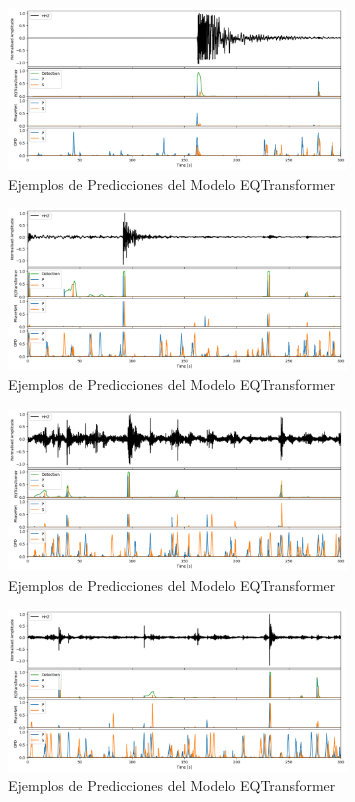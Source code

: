 \begin{figure}
\centering
\includegraphics[width=0.8\textwidth]{figures/testing/image0.png}
\caption{Ejemplos de Predicciones del Modelo EQTransformer}
\label{fig:predicciones}
\end{figure}

\begin{figure}
\centering
\includegraphics[width=0.8\textwidth]{figures/testing/image1.png}
\caption{Ejemplos de Predicciones del Modelo EQTransformer}
\label{fig:predicciones}
\end{figure}

\begin{figure}
\centering
\includegraphics[width=0.8\textwidth]{figures/testing/image3.png}
\caption{Ejemplos de Predicciones del Modelo EQTransformer}
\label{fig:predicciones}
\end{figure}

\begin{figure}
\centering
\includegraphics[width=0.8\textwidth]{figures/testing/image4.png}
\caption{Ejemplos de Predicciones del Modelo EQTransformer}
\label{fig:predicciones}
\end{figure}

